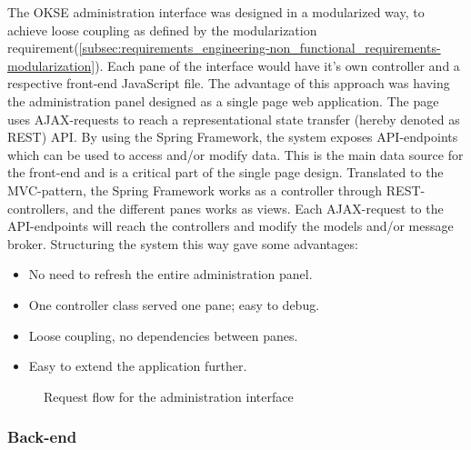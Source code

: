 The OKSE administration interface was designed in a modularized way, to achieve loose coupling as defined by the modularization requirement(\ref{subsec:requirements_engineering-non_functional_requirements-modularization}). Each pane of the interface would have it's own controller and a respective front-end JavaScript file. The advantage of this approach was having the administration panel designed as a single page web application. The page uses AJAX-requests to reach a representational state transfer (hereby denoted as REST) API. By using the Spring Framework, the system exposes API-endpoints which can be used to access and/or modify data. This is the main data source for the front-end and is a critical part of the single page design. Translated to the MVC-pattern, the Spring Framework works as a controller through REST-controllers, and the different panes works as views. Each AJAX-request to the API-endpoints will reach the controllers and modify the models and/or message broker. Structuring the system this way gave some advantages: 

\begin{itemize}
    \item No need to refresh the entire administration panel.
    \item One controller class served one pane; easy to debug.
    \item Loose coupling, no dependencies between panes.
    \item Easy to extend the application further.
\end{itemize}

\begin{center}
  \begin{figure}[ht!]
    \caption{Request flow for the administration interface}
    \label{fig:oac-request-flow}
  \end{figure}
\end{center}

\subsubsection{Back-end}

